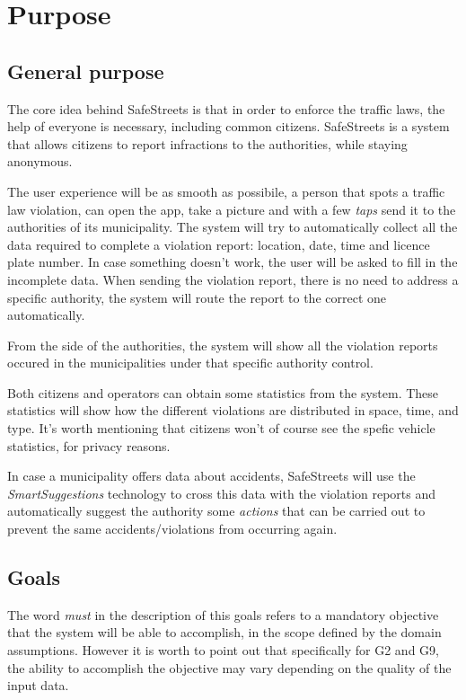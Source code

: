 \section{Purpose}
\subsection{General purpose}
The core idea behind SafeStreets is that in order to enforce the traffic laws,
the help of everyone is necessary, including common citizens.
SafeStreets is a system that allows citizens to report infractions to the
authorities, while staying anonymous.

The user experience will be as smooth as possibile, a person that spots a
traffic law violation, can open the app, take a picture and with a few
\emph{taps} send it to the authorities of its municipality.
The system will try to automatically collect all the data required to complete
a violation report: location, date, time and licence plate number. In case
something doesn't work, the user will be asked to fill in the incomplete data.
When sending the violation report, there is no need to address a specific
authority, the system will route the report to the correct one automatically.

From the side of the authorities, the system will show all the violation reports
occured in the municipalities under that specific authority control.

Both citizens and operators can obtain some statistics from the system. These
statistics will show how the different violations are distributed in space, time,
and type. It's worth mentioning that citizens won't of course see the spefic
vehicle statistics, for privacy reasons.

In case a municipality offers data about accidents, SafeStreets will use the
\emph{SmartSuggestions} technology to cross this data with the violation 
reports and automatically suggest the authority some \emph{actions} that can be
carried out to prevent the same accidents/violations from occurring again.

\subsection{Goals}

\begin{description}
\end{description}

\noindent
The word \emph{must} in the description of this goals refers to a mandatory
objective that the system will be able to accomplish, in the scope defined
by the domain assumptions.
However it is worth to point out that specifically for G2 and G9,
the ability to accomplish the objective may vary depending on the
quality of the input data.